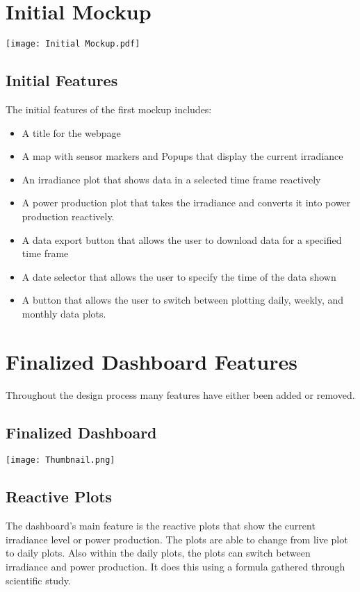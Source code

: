 \documentclass{sigchi}
\begin{document}
\section{Initial Mockup}
\texttt{[image: Initial Mockup.pdf]}
\label{fig:initial-mockup}

\subsection{Initial Features}
The initial features of the first mockup includes:
\begin{itemize}
    \item A title for the webpage
    \item A map with sensor markers and Popups that display the current irradiance
    \item An irradiance plot that shows data in a selected time frame reactively
    \item A power production plot that takes the irradiance and converts it into power production reactively.
    \item A data export button that allows the user to download data for a specified time frame
    \item A date selector that allows the user to specify the time of the data shown
    \item A button that allows the user to switch between plotting daily, weekly, and monthly data plots.
\end{itemize}

\section{Finalized Dashboard Features}
Throughout the design process many features have either been added or removed.
\subsection{Finalized Dashboard}
\texttt{[image: Thumbnail.png]}
\subsection{Reactive Plots}
The dashboard's main feature is the reactive plots that show the current irradiance level or power production. The plots are able to change from live plot to daily plots. Also within the daily plots, the plots can switch between irradiance and power production. It does this using a formula gathered through scientific study.\cite{8_PowerConversion}
\end{document}
